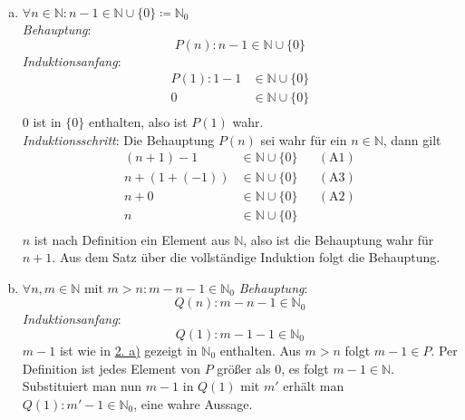 \documentclass{article}
\begin{document}
\begin{enumerate}[a)]
\item $\forall n \in \mathbb{N} \colon n - 1 \in \mathbb{N} \cup \{ 0 \} \coloneqq \mathbb{N}_0$ \\
  \label{sec:2_a}
  \emph{Behauptung}: \\
  \[
    P(n) \colon n - 1 \in \mathbb{N} \cup \{ 0 \} 
  \]
  \emph{Induktionsanfang}: \\
  \begin{align*}
    P(1) \colon 1 - 1 &\in \mathbb{N} \cup \{ 0 \} \\
                    0 &\in \mathbb{N} \cup \{ 0 \} \\
  \end{align*}
  $0$ ist in $\{ 0 \}$ enthalten, also ist $P(1)$ wahr. \\
  \emph{Induktionsschritt}: Die Behauptung $P(n)$ sei wahr für ein $n \in \mathbb{N}$,
  dann gilt \\
  \begin{align*}
    (n + 1) - 1    &\in \mathbb{N} \cup \{ 0 \} && (\text{A1}) \\
    n + (1 + (-1)) &\in \mathbb{N} \cup \{ 0 \} && (\text{A3}) \\
    n + 0          &\in \mathbb{N} \cup \{ 0 \} && (\text{A2}) \\
    n              &\in \mathbb{N} \cup \{ 0 \} \\
  \end{align*}
  $n$ ist nach Definition ein Element aus $\mathbb{N}$, also ist die Behauptung wahr für $n + 1$.
  Aus dem Satz über die vollständige Induktion folgt die Behauptung.
  
\item $\forall n, m \in \mathbb{N} \text{ mit } m > n \colon m - n - 1 \in \mathbb{N}_0$
  \emph{Behauptung}: \\
  \[
    Q(n) \colon m - n - 1 \in \mathbb{N}_0 
  \]
  \emph{Induktionsanfang}: \\
  \[
    Q(1) \colon m - 1 - 1 \in \mathbb{N}_0
  \]
  $m - 1$ ist wie in \hyperref[sec:2_a]{2. a)} gezeigt in $\mathbb{N}_0$ enthalten. Aus $m > n$ folgt
  $m - 1 \in P$. Per Definition ist jedes Element von $P$ größer als $0$, es folgt $m - 1 \in \mathbb{N}$.
  Substituiert man nun $m - 1$ in $Q(1)$ mit $m'$ erhält man $Q(1) \colon m' - 1 \in \mathbb{N}_0$, eine wahre Aussage.


\end{enumerate}
\end{document}
